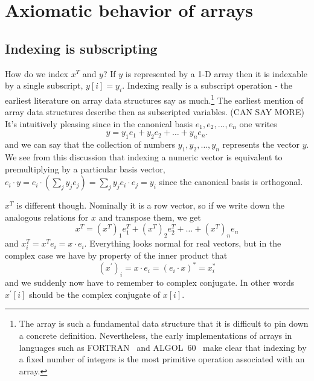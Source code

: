 \label{sec:array}
\section{Axiomatic behavior of arrays}

\subsection{Indexing is subscripting}

How do we index $x^{T}$ and $y$? If $y$ is represented by a 1-D
array then it is indexable by a single subscript, $y[i]=y_{i}$. Indexing
really is a subscript operation - the earliest literature on array
data structures say as much.\footnote{The array is such a fundamental data structure that it is difficult
to pin down a concrete definition. Nevertheless, the early implementations
of arrays in languages such as FORTRAN~\cite[p36]{Backus1956} and
ALGOL~60~\cite[Sec. 2.3]{Randell1964} make clear that indexing
by a fixed number of integers is the most primitive operation associated
with an array.} The earliest mention of array data structures describe then as subscripted
variables. (CAN SAY MORE) It's intuitively pleasing since in the canonical
basis $e_{1},e_{2},\dots,e_{n}$ one writes
\begin{equation}
y=y_{1}e_{1}+y_{2}e_{2}+\dots+y_{n}e_{n}.
\end{equation}
and we can say that the collection of numbers $y_{1},y_{2},\dots,y_{n}$
represents the vector $y$. We see from this discussion that indexing
a numeric vector is equivalent to premultiplying by a particular basis
vector, $e_{i}\cdot y=e_{i}\cdot\left(\sum_{j}y_{j}e_{j}\right)=\sum_{j}y_{j}e_{i}\cdot e_{j}=y_{i}$
since the canonical basis is orthogonal.

$x^{T}$ is different though. Nominally it is a row vector, so if
we write down the analogous relations for $x$ and transpose them,
we get
\begin{equation}
x^{T}=\left(x^{T}\right)_{1}e_{1}^{T}+\left(x^{T}\right)_{2}e_{2}^{T}+\dots+\left(x^{T}\right)_{n}e_{n}
\end{equation}
and $x_{i}^{T}=x^{T}e_{i}=x\cdot e_{i}$. Everything looks normal
for real vectors, but in the complex case we have by property of the
inner product that
\[
\left(x^{\prime}\right)_{i}=x\cdot e_{i}=\left(e_{i}\cdot x\right)^{*}=x_{i}^{*}
\]
and we suddenly now have to remember to complex conjugate. In other
words $x^{\prime}[i]$ should be the complex conjugate of $x[i]$.


